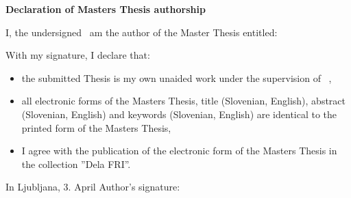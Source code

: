 \vspace*{1cm}
\begin{center}
{\Large \textbf{\sc Declaration of Masters Thesis authorship}}
\end{center}

\vspace{1cm}
\noindent I, the undersigned \tauthor\ am the author of the Master Thesis entitled:

\vspace{0.5cm}
\begin{center}
\emph{\ttitleEn}
\end{center}

\vspace{1cm}
\noindent With my signature, I declare that:
\begin{itemize}
	\item the submitted Thesis is my own unaided work under the supervision of \mysupervisor\ ,

	\item all electronic forms of the Masters Thesis, title (Slovenian, English), abstract (Slovenian, English) and keywords (Slovenian, English) are identical to the printed form of the Masters Thesis,
	\item I agree with the publication of the electronic form of the Masters Thesis in the collection ''Dela FRI''. 
\end{itemize}

\vspace{1cm}
\noindent In Ljubljana, 3. April \myyear \hfill Author's signature: